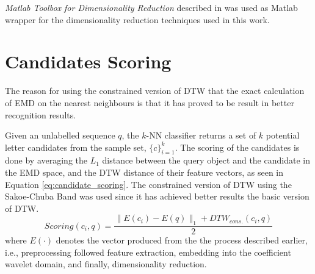 \iftoggle{edit-mode}{\hspace{0pt}\marginpar{The DR package}}{}
\emph{Matlab Toolbox for Dimensionality Reduction} described in \cite{van2007introduction} was used as Matlab wrapper for the dimensionality reduction techniques used in this work.

\newpage{}


\section{Candidates Scoring}
\label{sec:candidates_scoring}

\iftoggle{edit-mode}{\hspace{0pt}\marginpar{The recognition process - justification}}{}
The reason for using the constrained version of DTW that the exact calculation of EMD on the nearest neighbours is that it has proved to be result in better recognition results.

\iftoggle{edit-mode}{\hspace{0pt}\marginpar{From the paper}}{}
Given an unlabelled sequence $q$, the $k$-NN classifier returns a set of $k$ potential letter candidates from the sample set, $\{c\}_{i=1}^{k}$.
The scoring of the candidates is done by averaging the $L_1$ distance between the query object and the candidate in the EMD space, and the DTW distance of their feature vectors, as seen in Equation \ref{eq:candidate_scoring}.
The constrained version of DTW using the Sakoe-Chuba Band \cite{sakoe1978dynamic} was used since it has achieved better results the basic version of DTW.
\begin{equation}
Scoring(c_i,q)=\frac{\|E(c_i)-E(q)\|_1+DTW_{cons.}(c_i,q)}{2}
\label{eq:candidate_scoring}
\end{equation}
where $E(\cdot)$ denotes the vector produced from the the process described earlier, i.e., preprocessing followed feature extraction, embedding into the coefficient wavelet domain, and finally, dimensionality reduction.


%
%
%
